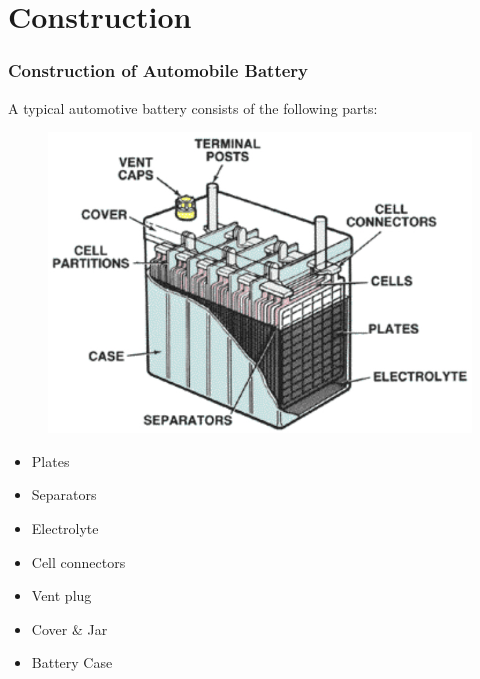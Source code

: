 \documentclass{beamer}
\begin{document}
\section{Construction}

\begin{frame}     %
  \frametitle{Construction of Automobile Battery}
  \fontsize{8pt}{12}\selectfont
  
  \begin{center}
    A typical automotive battery consists of the following parts:
  \end{center}

  \vspace{-10pt}
  \begin{figure}
    \includegraphics[width=0.4\paperwidth]{./Resources/Images/construction.jpg}
  \end{figure}  
  \vspace{-50pt}
  
  \begin{itemize}
    \item Plates
    \item Separators
    \item Electrolyte
    \item Cell connectors
    \item Vent plug
    \item Cover \& Jar
    \item Battery Case
  \end{itemize}

\end{frame}
\end{document}
